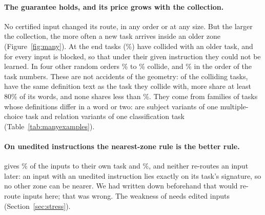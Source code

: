 \paragraph{The guarantee holds, and its price grows with the collection.} No certified input changed
its route, in any order or at any size. But the larger the
collection, the more often a new task arrives inside an older zone (Figure~\ref{fig:many}). At the end \ManyColliding{} tasks
(\ManyCollidingPct{}\%) have collided with an older task, and for \ManyAllHeld{} every input is
blocked, so that under their given instruction they could not be learned. In four other
random orders \ManyCollidingPctLow{}\% to \ManyCollidingPctHigh{}\% collide,
and \ManyNumericCollidingPct{}\% in the order of the task numbers. These are not
accidents of the geometry: of the \ManyColliding{} colliding tasks, \ManySameText{} have the same
definition text as the task they collide with, \ManyAlikeHigh{} more share at least 80\% of its words,
and none shares less than \ManyAlikeLowest{}\%. They come from families
of tasks whose definitions differ in a word or two: \ManyFamilyMmlu{} are subject variants of one
multiple-choice task and \ManyFamilyAtomic{} relation variants of one classification task
(Table~\ref{tab:manyexamples}).

\paragraph{On unedited instructions the nearest-zone rule is the better rule.} \nearest{} gives
\ManyNearRightPct{}\% of the inputs to their own task and \cert{} \ManyCertRightPct{}\%, and neither re-routes an input later: an
input with an unedited instruction lies exactly on its task's signature, so no other zone can
be nearer. We had written down beforehand that \nearest{}
would re-route inputs here; that was wrong. The weakness of \nearest{} needs edited inputs (Section~\ref{sec:stress}).

